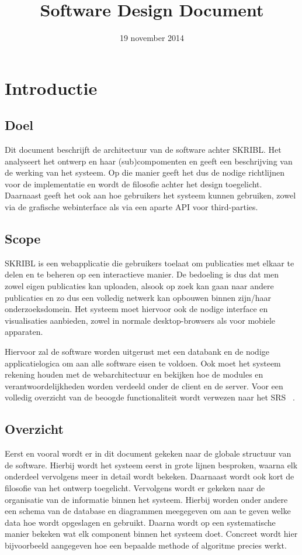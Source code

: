 \documentclass{article}
\title{Software Design Document}
\author{} %
\date{19 november 2014} %
\begin{document}




\tableofcontents
\newpage

\section{Introductie}

\subsection{Doel}

Dit document beschrijft de architectuur van de software achter SKRIBL. 
Het analyseert het ontwerp en haar (sub)compomenten en geeft een beschrijving
van de werking van het systeem. Op die manier geeft het dus de nodige richtlijnen
voor de implementatie en wordt de filosofie achter het design toegelicht.
Daarnaast geeft het ook aan hoe gebruikers het systeem kunnen gebruiken, zowel
via de grafische webinterface als via een aparte API voor third-parties.

\subsection{Scope}

SKRIBL is een webapplicatie die gebruikers toelaat om publicaties met elkaar te delen
en te beheren op een interactieve manier. De bedoeling is dus dat men zowel eigen publicaties kan uploaden, alsook op zoek kan gaan naar andere publicaties en zo dus een volledig netwerk kan opbouwen binnen zijn/haar onderzoeksdomein. Het systeem moet hiervoor ook de nodige interface en visualisaties aanbieden, zowel in normale desktop-browsers als voor mobiele apparaten.

Hiervoor zal de software worden uitgerust met een databank en de nodige applicatielogica om aan alle software eisen te voldoen. Ook moet het systeem rekening houden met de webarchitectuur en bekijken hoe de modules en verantwoordelijkheden worden verdeeld onder de client en de server. Voor een volledig overzicht van de beoogde functionaliteit wordt verwezen naar het SRS ~\cite{Xtreport:SRS}.

\subsection{Overzicht}

Eerst en vooral wordt er in dit document gekeken naar de globale structuur van de software. Hierbij wordt het systeem eerst in grote lijnen besproken, waarna elk onderdeel vervolgens meer in detail wordt bekeken. Daarnaast wordt ook kort de filosofie van het ontwerp toegelicht. 
Vervolgens wordt er gekeken naar de organisatie van de informatie binnen het systeem. Hierbij worden onder andere een schema van de database en diagrammen meegegeven om aan te geven welke data hoe wordt opgeslagen en gebruikt. 
Daarna wordt op een systematische manier bekeken wat elk component binnen het systeem doet. Concreet wordt hier bijvoorbeeld aangegeven hoe een bepaalde methode of algoritme precies werkt.
\end{document}
